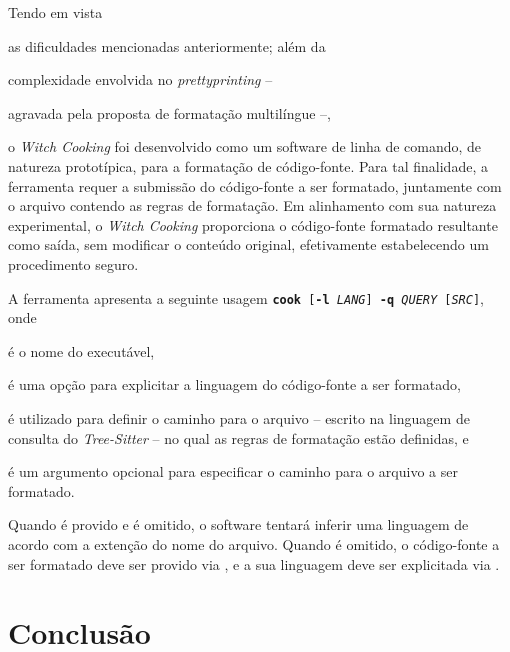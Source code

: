 \documentclass
  [11pt, a4paper, english, openright, sumario = tradicional, twoside, brazil]
  {abntex2}
\begin{document}
  Tendo em vista
  \begin{inparaenum}
    \item as dificuldades mencionadas anteriormente; além da
    \item complexidade envolvida no \textit{prettyprinting} --
    \item agravada pela proposta de formatação multilíngue --,
  \end{inparaenum}
  o \textit{Witch Cooking} foi desenvolvido como um software de linha de
  comando, de natureza prototípica, para a formatação de código-fonte. Para
  tal finalidade, a ferramenta requer a submissão do código-fonte a ser
  formatado, juntamente com o arquivo contendo as regras de formatação. Em
  alinhamento com sua natureza experimental, o \textit{Witch Cooking}
  proporciona o código-fonte formatado resultante como saída, sem modificar o
  conteúdo original, efetivamente estabelecendo um procedimento seguro.

  A ferramenta apresenta a seguinte usagem
  \boxed
    {\texttt{\textbf{cook}
     [\textbf{-l} \textit{LANG}]
     \textbf{-q} \textit{QUERY}
     [\textit{SRC}]}},
  onde
  \begin{inparaenum}
    \item {} é o nome do executável,
    \item {} é uma opção para
          explicitar a linguagem do código-fonte a ser formatado,
    \item {} é utilizado para
          definir o caminho para o arquivo -- escrito na linguagem de consulta
          do \textit{Tree-Sitter} -- no qual as regras de formatação estão
          definidas, e
    \item {} é um argumento opcional para
          especificar o caminho para o arquivo a ser formatado.
  \end{inparaenum}
  Quando  é provido e
   é omitido, o software tentará
  inferir uma linguagem de acordo com a extenção do nome do arquivo. Quando
   é omitido, o código-fonte a ser formatado
  deve ser provido via \textit{}, e a sua linguagem deve
  ser explicitada via .


  \chapter{Conclusão}


  \postextual
  \printbibliography
\end{document}
